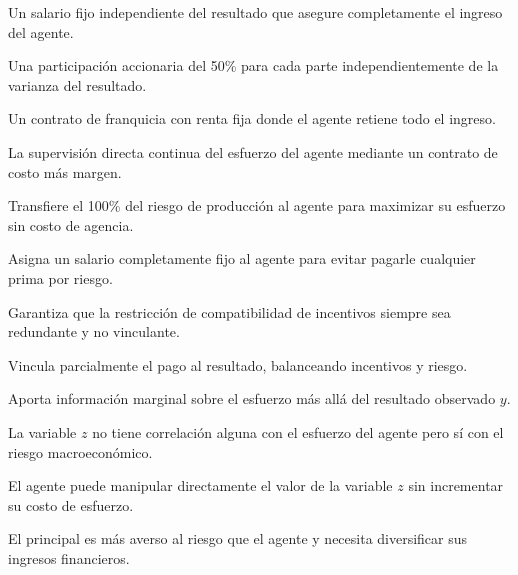 \begin{opts}
    \item Un salario fijo independiente del resultado que asegure completamente el ingreso del agente.
    \item Una participación accionaria del 50\% para cada parte independientemente de la varianza del resultado.
    \item Un contrato de franquicia con renta fija donde el agente retiene todo el ingreso.
    \item La supervisión directa continua del esfuerzo del agente mediante un contrato de costo más margen.
\end{opts}

\begin{opts}
    \item Transfiere el 100\% del riesgo de producción al agente para maximizar su esfuerzo sin costo de agencia.
    \item Asigna un salario completamente fijo al agente para evitar pagarle cualquier prima por riesgo.
    \item Garantiza que la restricción de compatibilidad de incentivos siempre sea redundante y no vinculante.
    \item Vincula parcialmente el pago al resultado, balanceando incentivos y riesgo.
\end{opts}

\begin{opts}
    \item Aporta información marginal sobre el esfuerzo más allá del resultado observado $y$.
    \item La variable $z$ no tiene correlación alguna con el esfuerzo del agente pero sí con el riesgo macroeconómico.
    \item El agente puede manipular directamente el valor de la variable $z$ sin incrementar su costo de esfuerzo.
    \item El principal es más averso al riesgo que el agente y necesita diversificar sus ingresos financieros.
\end{opts}

